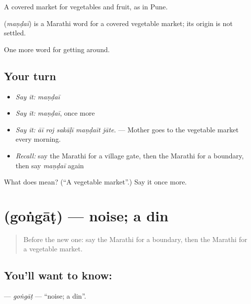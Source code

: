 A covered market for vegetables and fruit, as in Pune.

\begin{cousinweb}
\textbf{} (\emph{maṇḍaī}) is a Marathi word for a covered vegetable market; its origin is not settled.
\end{cousinweb}

\begin{grammarlens}[title={What you've built}]
One more word for getting around.
\end{grammarlens}

\subsection*{Your turn}
\begin{itemize}
\raggedright
  \item \emph{Say it:} \emph{maṇḍaī}
  \item \emph{Say it:} \emph{maṇḍaī}, once more
  \item \emph{Say it:} \emph{āī roj sakāḷī maṇḍaīt jāte.} — Mother goes to the vegetable market every morning.
  \item \emph{Recall:} say the Marathi for a village gate, then the Marathi for a boundary, then say \emph{maṇḍaī} again
\end{itemize}

\begin{tcolorbox}[breakable,colback=teal!4,colframe=teal!35!black,title={Before you move on}]
What does  mean? (\textquotedblleft{}A vegetable market\textquotedblright{}.) Say it once more.
\end{tcolorbox}
\section[\texorpdfstring{\mr{गोंगाट} (goṅgāṭ)}{गोंगाट (goṅgāṭ)}]{ (goṅgāṭ) — noise; a din}

\label{lesson:MR-C422-gongat}



\begin{quote}
Before the new one: say the Marathi for a boundary, then the Marathi for a vegetable market.
\end{quote}

\subsection*{You'll want to know: }
\textbf{} — \emph{goṅgāṭ} — \textquotedblleft{}noise; a din\textquotedblright{}.

